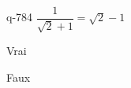 \begin{truefalse}{q-784}
$\dfrac{1}{\sqrt{2}+1}=\sqrt{2}-1$
\item* Vrai
\item Faux
\end{truefalse}

